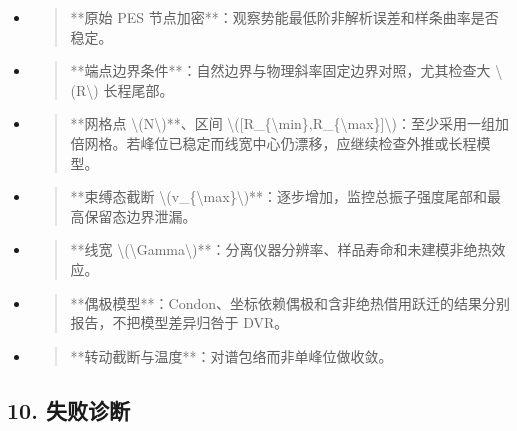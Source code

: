 \documentclass[UTF8,openany,11pt,fontset=fandol]{ctexbook}
\begin{document}
\begin{itemize}
\item
  \begin{quote}
  **原始 PES 节点加密**：观察势能最低阶非解析误差和样条曲率是否稳定。
  \end{quote}
\item
  \begin{quote}
  **端点边界条件**：自然边界与物理斜率固定边界对照，尤其检查大
  \textbackslash(R\textbackslash) 长程尾部。
  \end{quote}
\item
  \begin{quote}
  **网格点 \textbackslash(N\textbackslash)**、区间
  \textbackslash({[}R\_\{\textbackslash min\},R\_\{\textbackslash max\}{]}\textbackslash)：至少采用一组加倍网格。若峰位已稳定而线宽中心仍漂移，应继续检查外推或长程模型。
  \end{quote}
\item
  \begin{quote}
  **束缚态截断
  \textbackslash(v\_\{\textbackslash max\}\textbackslash)**：逐步增加，监控总振子强度尾部和最高保留态边界泄漏。
  \end{quote}
\item
  \begin{quote}
  **线宽
  \textbackslash(\textbackslash Gamma\textbackslash)**：分离仪器分辨率、样品寿命和未建模非绝热效应。
  \end{quote}
\item
  \begin{quote}
  **偶极模型**：Condon、坐标依赖偶极和含非绝热借用跃迁的结果分别报告，不把模型差异归咎于
  DVR。
  \end{quote}
\item
  \begin{quote}
  **转动截断与温度**：对谱包络而非单峰位做收敛。
  \end{quote}
\end{itemize}

\subsection{\texorpdfstring{\textbf{10.
失败诊断}}{10. 失败诊断}}\label{ux5931ux8d25ux8bcaux65ad}
\end{document}
